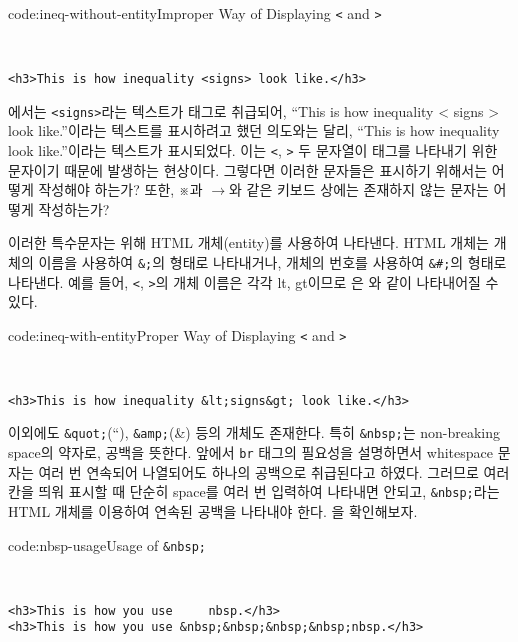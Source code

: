 \begin{codeenv}{code:ineq-without-entity}{Improper Way of Displaying \texttt{<} and \texttt{>}}\begin{verbatim}


<h3>This is how inequality <signs> look like.</h3>
\end{verbatim}
\end{codeenv}

에서는 \texttt{<signs>}라는 텍스트가 태그로 취급되어, ``This is how inequality {\textless} signs {\textgreater} look like.''이라는 텍스트를 표시하려고 했던 의도와는 달리, ``This is how inequality look like.''이라는 텍스트가 표시되었다. 이는 \texttt{<}, \texttt{>} 두 문자열이 태그를 나타내기 위한 문자이기 때문에 발생하는 현상이다. 그렇다면 이러한 문자들은 표시하기 위해서는 어떻게 작성해야 하는가? 또한, ※과 $\rightarrow$와 같은 키보드 상에는 존재하지 않는 문자는 어떻게 작성하는가?

이러한 특수문자는 위해 HTML 개체(entity)를 사용하여 나타낸다. HTML 개체는 개체의 이름을 사용하여 \texttt{\&<entity-name>;}의 형태로 나타내거나, 개체의 번호를 사용하여 \texttt{\&\#<entity-number>;}의 형태로 나타낸다. 예를 들어, \texttt{<}, \texttt{>}의 개체 이름은 각각 lt, gt이므로 은 와 같이 나타내어질 수 있다.

\begin{codeenv}{code:ineq-with-entity}{Proper Way of Displaying \texttt{<} and \texttt{>}}\begin{verbatim}


<h3>This is how inequality &lt;signs&gt; look like.</h3>
\end{verbatim}
\end{codeenv}

이외에도 \texttt{\&quot;}(``), \texttt{\&amp;}(\&) 등의 개체도 존재한다. 특히 \texttt{\&nbsp;}는 non-breaking space의 약자로, 공백을 뜻한다. 앞에서 \texttt{br} 태그의 필요성을 설명하면서 whitespace 문자는 여러 번 연속되어 나열되어도 하나의 공백으로 취급된다고 하였다. 그러므로 여러 칸을 띄워 표시할 때 단순히 space를 여러 번 입력하여 나타내면 안되고, \texttt{\&nbsp;}라는 HTML 개체를 이용하여 연속된 공백을 나타내야 한다. 을 확인해보자.

\begin{codeenv}{code:nbsp-usage}{Usage of \texttt{\&nbsp;}}\begin{verbatim}


<h3>This is how you use     nbsp.</h3>
<h3>This is how you use &nbsp;&nbsp;&nbsp;&nbsp;nbsp.</h3>
\end{verbatim}
\end{codeenv}

